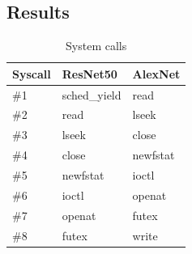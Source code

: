 \documentclass[conference]{IEEEtran}
\begin{document}
\subsection{Results}

\begin{table}
    \caption{System calls}\label{tab:syscalls}
    \begin{center}
        \begin{tabular}[c]{|l|l|l|}
            \hline
            \rowcolor{gray}
            Syscall & ResNet50 & AlexNet\\
            \hline
            \rowcolor{lightgray}
            \#1 & sched\_yield & read\\
            \hline
            \#2 & read & lseek\\
            \hline
            \rowcolor{lightgray}
            \#3 & lseek & close\\
            \hline
            \#4 & close & newfstat\\
            \hline
            \rowcolor{lightgray}
            \#5 & newfstat & ioctl\\
            \hline
            \#6 & ioctl & openat\\
            \hline
            \rowcolor{lightgray}
            \#7 & openat & futex\\
            \hline
            \#8 & futex & write\\
            \hline
        \end{tabular}
    \end{center}
\end{table}
\end{document}
